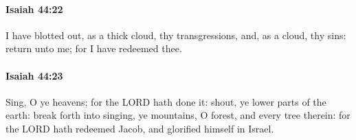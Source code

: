 		\paragraph{Isaiah 44:22} %
			\label{ISAIAH-44-22}

			I have blotted out, as a thick cloud, thy transgressions, and, as a cloud, thy sins: return unto me; for I have redeemed thee.


		\paragraph{Isaiah 44:23} %
			\label{ISAIAH-44-23}

			Sing, O ye heavens; for the LORD hath done it: shout, ye lower parts of the earth: break forth into singing, ye mountains, O forest, and every tree therein: for the LORD hath redeemed Jacob, and glorified himself in Israel.


